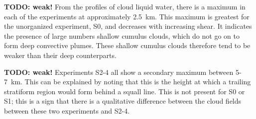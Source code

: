 \documentclass[11pt,a4paper]{article}
\newcommand\todo[1]{\textbf{TODO: #1}}
\begin{document}
\todo{weak!}
From the profiles of cloud liquid water, there is a maximum in each of the experiments at approximately \SI{2.5}{km}. This maximum is greatest for the unorganized experiment, S0, and decreases with increasing shear. It indicates the presence of large numbers shallow cumulus clouds, which do not go on to form deep convective plumes. These shallow cumulus clouds therefore tend to be weaker than their deep counterparts.

\todo{weak!}
Experiments S2-4 all show a secondary maximum between \SI{5}{}-\SI{7}{km}. This can be explained by noting that this is the height at which a trailing stratiform region would form behind a squall line. This is not present for S0 or S1; this is a sign that there is a qualitative difference between the cloud fields between these two experiments and S2-4.

\end{document}
